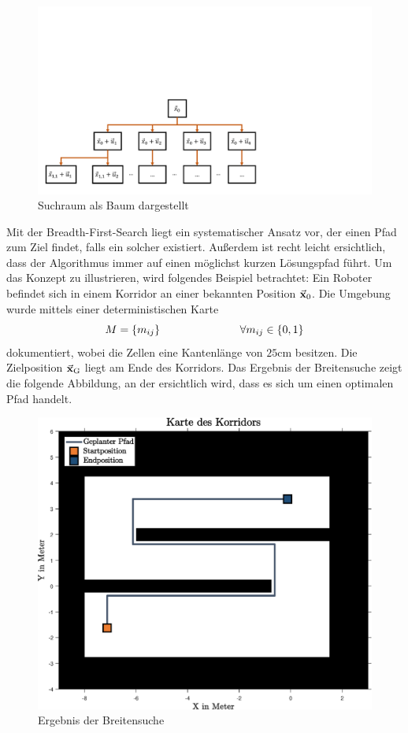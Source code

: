 \begin{figure}[!ht]
\centering
\includegraphics[width=\linewidth, trim={0cm 0cm 10cm 9cm}, clip]{img/Suchbaum.pdf}
\caption{Suchraum als Baum dargestellt}
\end{figure}
Mit der Breadth-First-Search liegt ein systematischer Ansatz vor, der einen Pfad zum Ziel findet, falls ein solcher existiert. Außerdem ist recht leicht ersichtlich, dass der Algorithmus immer auf einen möglichst kurzen Lösungspfad führt. Um das Konzept zu illustrieren, wird folgendes Beispiel betrachtet: Ein Roboter befindet sich in einem Korridor an einer bekannten Position $\vec{\mathbf{x}}_{\text{0}}$. Die Umgebung wurde mittels einer deterministischen Karte
\begin{equation}
M = \left\{m_{ij}\right\} \hspace{2.5cm} \forall m_{ij} \in \left\{0, 1\right\}
\end{equation}
dokumentiert, wobei die Zellen eine Kantenlänge von $25 \text{cm}$ besitzen. Die Zielposition $\vec{\mathbf{x}}_{\text{G}}$ liegt am Ende des Korridors. Das Ergebnis der Breitensuche zeigt die folgende Abbildung, an der ersichtlich wird, dass es sich um einen optimalen Pfad handelt.
\begin{figure}[!ht]
\centering
\includegraphics[width=0.7\linewidth]{img/KorridorBeispiel_img1.eps}
\caption{Ergebnis der Breitensuche}
\end{figure}


